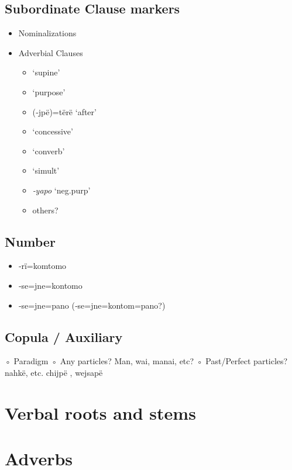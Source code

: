\documentclass{memoir}
\begin{document}
\section{Subordinate Clause markers}

\begin{itemize}
\tightlist
\item
  Nominalizations
\item
  Adverbial Clauses

  \begin{itemize}
  \tightlist
  \item
     `supine'
  \item
     `purpose'
  \item
    (‑jpë)=tërë `after'
  \item
     `concessive'
  \item
     `converb'
  \item
     `simult'
  \item
    \emph{‑yapo} `neg.purp'
  \item
    others?
  \end{itemize}
\end{itemize}

\section{Number}

\begin{itemize}
\tightlist
\item
  ‑rï=komtomo
\item
  ‑se=jne=kontomo
\item
  ‑se=jne=pano (‑se=jne=kontom=pano?)
\end{itemize}

\section{Copula / Auxiliary}

◦ Paradigm ◦ Any particles? Man, wai, manai, etc? ◦ Past/Perfect
particles? nahkë, etc. chijpë , wejsapë

\chapter{\texorpdfstring{Verbal roots and stems
\label{derbderiv}}{Verbal roots and stems }}

\chapter{\texorpdfstring{Adverbs \label{adverbs}}{Adverbs }}
\end{document}
